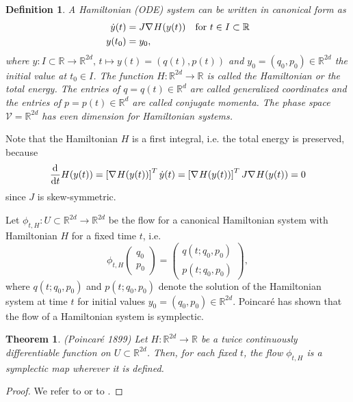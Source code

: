 \documentclass[twoside,a4paper]{article}
\newtheorem{definition}{Definition}
\newtheorem{theorem}{Theorem}
\begin{document}
\begin{definition}
	A Hamiltonian (ODE) system can be written in canonical form as
	\begin{align*}
		\dot{y}(t) &= J \nabla_{}{H}(y(t)) \quad \text{for } t \in I \subset \mathbb{R} \\
		y(t_0) &= y_0
		,
	\end{align*}
	where $y: I \subset \mathbb{R} \to \mathbb{R}^{2d},\, t \mapsto y(t) = (q(t),p(t))$ and 
	$y_0 = (q_0, p_0) \in \mathbb{R}^{2d}$ the initial value at $t_0 \in I$. 
	The function $H: \mathbb{R}^{2d} \to \mathbb{R}$ is called the Hamiltonian 
	or the total energy. The entries of $q = q(t) \in \mathbb{R}^d$ are called 
	generalized coordinates
	and the entries of $p=p(t) \in \mathbb{R}^d$ are called conjugate momenta. 
	The phase space $\mathcal{V} = \mathbb{R}^{2d}$ has even dimension for Hamiltonian systems.
\end{definition}

Note that the Hamiltonian $H$ is a first integral, i.e. the total energy is preserved, because
\begin{equation*}
	\frac{\mathrm{d}^{}}{\mathrm{d}t} H(y(t)) = \left[ \nabla_{}{H}(y(t)) \right]^T \dot{y}(t) = 
	\left[ \nabla_{}{H}(y(t)) \right]^T J \nabla_{}{H}(y(t)) = 0
\end{equation*}
since $J$ is skew-symmetric.

Let $\phi_{t,H} : U \subset \mathbb{R}^{2d} \to \mathbb{R}^{2d}$ be the flow for a 
canonical Hamiltonian system with Hamiltonian $H$ for a fixed time $t$, i.e.
\begin{equation*}
	\phi_{t,H}\begin{pmatrix}
		q_0 \\
		p_0
	\end{pmatrix}
	= \begin{pmatrix}
		q(t; q_0, p_0) \\
		p(t; q_0, p_0)
	\end{pmatrix}
	,
\end{equation*}
where $q(t; q_0, p_0)$ and $p(t; q_0, p_0)$ denote the solution of the Hamiltonian system
at time $t$ for initial values $y_0 = (q_0,p_0) \in \mathbb{R}^{2d}$. 
Poincaré has shown that the flow of a Hamiltonian system is symplectic.

\begin{theorem}(Poincaré 1899)
	Let $H: \mathbb{R}^{2d} \to \mathbb{R}$ be a twice continuously differentiable
	function on $U \subset \mathbb{R}^{2d}$. Then, for each fixed $t$, the flow
	$\phi_{t,H}$ is a symplectic map wherever it is defined.
\end{theorem}
\begin{proof}
	We refer to \citet[Theorem 2.4, p.~184]{hairer2006} 
	or to \citet[Theorem 1, p.~54]{leimkuhler_reich_2005}.
\end{proof}
\end{document}
